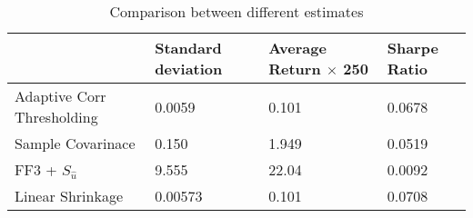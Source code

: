 \begin{table}[htbp]
    \begin{tabular}{l|lll}
        & Standard deviation & Average Return \(\times\) 250 & Sharpe Ratio \\ 
        \hline
        Adaptive Corr Thresholding & 0.0059            & 0.101            & 0.0678       \\
        Sample Covarinace & 0.150 & 1.949 & 0.0519 \\ 
        FF3 + \(S_{\hat{u}}\) & 9.555 &22.04 & 0.0092 \\ 
        Linear Shrinkage                  & 0.00573           & 0.101             & 0.0708       \\
    \end{tabular}
    \caption{Comparison between different estimates}
    \label{table:empirical-2020-12-13T171549}
\end{table}
